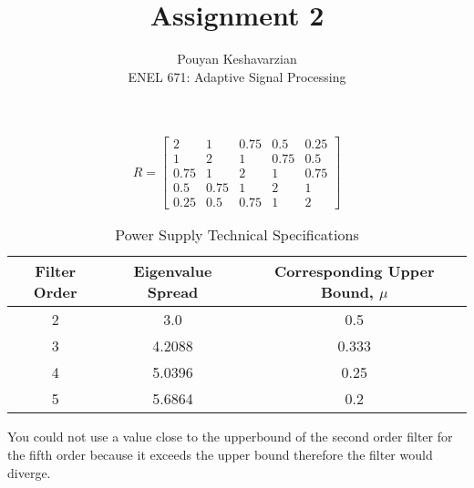 \documentclass[12pt]{article}
\newenvironment{problem}[2][Problem]{\begin{trivlist}
\item[\hskip \labelsep {\bfseries #1}\hskip \labelsep {\bfseries #2.}]}{\end{trivlist}}
\begin{document}
\title{Assignment 2}
\author{Pouyan Keshavarzian\\
ENEL 671: Adaptive Signal Processing}

\maketitle

\begin{problem}{1}
\text{}
\begin{center}
  \[
  R=
    \begin{bmatrix}
      2 & 1 & 0.75 & 0.5 & 0.25 \\
      1 & 2 & 1 & 0.75 & 0.5 \\
      0.75 & 1 & 2 & 1 & 0.75 \\
      0.5 & 0.75 & 1 & 2 & 1 \\
      0.25 & 0.5 & 0.75 & 1 & 2
    \end{bmatrix}
  \]
\end{center}

\begin{table}[H]
\centering
 \begin{tabular}{ | c | c | c |}
    \hline
    Filter Order & Eigenvalue Spread & Corresponding Upper Bound, $\mu$\\
    \hline\hline
    2        & 3.0 & 0.5 \\
    \hline
    3        & 4.2088 & 0.333 \\
    \hline
    4        & 5.0396 & 0.25\\
    \hline
    5        & 5.6864 & 0.2\\
    \hline
  \end{tabular}
  \caption{ Power Supply Technical Specifications }
  \label{table:powerspecs}
\end{table}
You could not use a value close to the upperbound of the second order
filter for the fifth order because it exceeds the upper bound
therefore the filter would diverge.\\
\end{problem}
\end{document}
